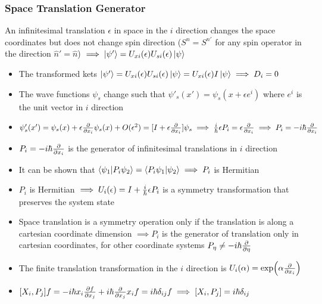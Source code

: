 \documentclass[8pt,t,mathserif,aspectratio=169]{beamer}
\begin{document}
\begin{frame}
  \frametitle{Space Translation Generator}
  \vspace{1mm}
  An infinitesimal translation $\epsilon$ in space in the $i$ direction changes the space coordinates but does not change spin direction ($S^n = S^{n'}$ for any spin operator in the direction $\hat{n}' = \hat{n}$) $\implies \ket{\psi'} = U_{xi}(\epsilon) U_{si}(\epsilon) \ket{\psi}$
  \begin{itemize}
    \item The transformed kets $\ket{\psi'} = U_{xi}(\epsilon) U_{si}(\epsilon) \ket{\psi} = U_{xi}(\epsilon) I \ket{\psi} \implies D_i = 0$
    \item The wave functions $\psi_s$ change such that $\psi'_s(x') = \psi_s(x + \epsilon e^i)$ where $e^i$ is the unit vector in $i$ direction
    \item $\psi'_s(x') = \psi_s(x) + \epsilon {\partial \over \partial x_i} \psi_s(x) + O(\epsilon^2) = [I + \epsilon {\partial \over \partial x_i}] \psi_s \implies {i \over \hbar} \epsilon P_i = \epsilon {\partial \over \partial x_i} \implies P_i = -i \hbar {\partial \over \partial x_i}$
    \item $P_i = -i \hbar {\partial \over \partial x_i}$ is the generator of infinitesimal translations in $i$ direction
    \item It can be shown that $\bra{\psi_1}\ket{P_i \psi_2} = \bra{P_i \psi_1} \ket{\psi_2} \implies P_i$ is Hermitian 
    \item $P_i$ is Hermitian $\implies U_i(\epsilon) = I + {i \over \hbar} \epsilon P_i$ is a symmetry transformation that preserves the system state
    \item Space translation is a symmetry operation only if the translation is along a cartesian coordinate dimension $\implies P_i$ is the generator of translation only in cartesian coordinates, for other coordinate systems $P_\eta \neq -i \hbar {\partial \over \partial \eta}$
    \item The finite translation transformation in the $i$ direction is $U_i(\alpha) = \exp(\alpha {\partial \over \partial x_i})$
    \item $[X_i,P_j]f = -i \hbar x_i {\partial f \over \partial x_j} + i \hbar {\partial \over \partial x_j} x_i f = i \hbar \delta_{ij} f \implies [X_i,P_j] = i \hbar \delta_{ij}$
  \end{itemize}
\end{frame}
\end{document}
